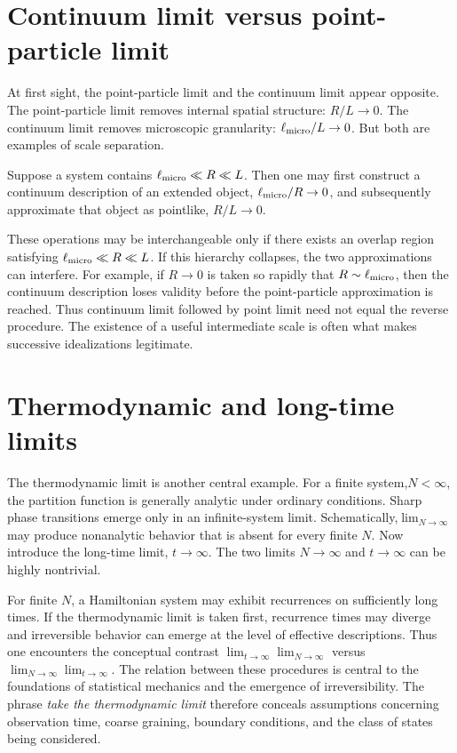 \section{Continuum limit versus point-particle limit}
At first sight, the point-particle limit and the continuum limit appear opposite.
The point-particle limit removes internal spatial structure:
$R/L\rightarrow 0$. The continuum limit removes microscopic granularity:
$\ell_{\rm micro}/L\rightarrow 0$.
But both are examples of scale separation.

Suppose a system contains
$\ell_{\rm micro}\ll R \ll L$.
Then one may first construct a continuum description of an extended object,
$\ell_{\rm micro}/R\rightarrow 0$,
and subsequently approximate that object as pointlike,
$R/L\rightarrow 0$.

These operations may be interchangeable only if there exists an overlap region satisfying
$\ell_{\rm micro}\ll R \ll L$.
If this hierarchy collapses, the two approximations can interfere.
For example, if $R\rightarrow 0$ is taken so rapidly that $R\sim\ell_{\rm micro}$,
then the continuum description loses validity before the point-particle approximation is reached.
Thus continuum limit followed by point limit need not equal the reverse procedure.
The existence of a useful intermediate scale is often what makes successive idealizations legitimate.

\section{Thermodynamic and long-time limits}
The thermodynamic limit is another central example.
For a finite system,$N<\infty$,
the partition function is generally analytic under ordinary conditions. Sharp phase 
transitions emerge only in an infinite-system limit.
Schematically,$\lim_{N\rightarrow\infty}$
may produce nonanalytic behavior that is absent for every finite $N$.
Now introduce the long-time limit, $t\rightarrow\infty$.
The two limits $N\rightarrow\infty$ and $t\rightarrow\infty$
can be highly nontrivial.

For finite $N$, a Hamiltonian system may exhibit recurrences on sufficiently
long times. If the thermodynamic limit is taken first, recurrence times may
diverge and irreversible behavior can emerge at the level of effective
descriptions.
Thus one encounters the conceptual contrast
$\lim_{t\to\infty}\lim_{N\to\infty}$ versus $\lim_{N\to\infty}\lim_{t\to\infty}$.
The relation between these procedures is central to the foundations of statistical mechanics and the emergence of irreversibility.
The phrase \emph{take the thermodynamic limit} therefore conceals assumptions 
concerning observation time, coarse graining, boundary conditions, and the 
class of states being considered.

